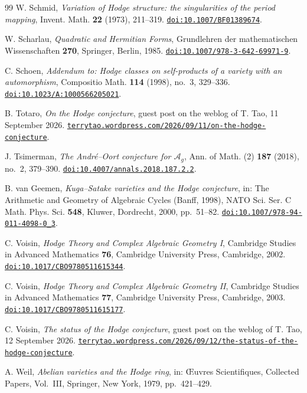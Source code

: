 \begin{thebibliography}{99}
W. Schmid,
\emph{Variation of Hodge structure: the singularities of the period mapping},
Invent. Math. \textbf{22} (1973), 211--319.
\href{https://doi.org/10.1007/BF01389674}{\texttt{doi:10.1007/BF01389674}}.

W. Scharlau,
\emph{Quadratic and Hermitian Forms},
Grundlehren der mathematischen Wissenschaften \textbf{270},
Springer, Berlin, 1985.
\href{https://doi.org/10.1007/978-3-642-69971-9}{\texttt{doi:10.1007/978-3-642-69971-9}}.

C. Schoen,
\emph{Addendum to: Hodge classes on self-products of a variety with an
automorphism},
Compositio Math. \textbf{114} (1998), no.~3, 329--336.
\href{https://doi.org/10.1023/A:1000566205021}{\texttt{doi:10.1023/A:1000566205021}}.

B. Totaro,
\emph{On the Hodge conjecture},
guest post on the weblog of T. Tao, 11 September 2026.
\href{https://terrytao.wordpress.com/2026/09/11/on-the-hodge-conjecture/}%
{\texttt{terrytao.wordpress.com/2026/09/11/on-the-hodge-conjecture}}.

J. Tsimerman,
\emph{The Andr\'e--Oort conjecture for $\mathcal{A}_{g}$},
Ann. of Math. (2) \textbf{187} (2018), no.~2, 379--390.
\href{https://doi.org/10.4007/annals.2018.187.2.2}{\texttt{doi:10.4007/annals.2018.187.2.2}}.

B. van Geemen,
\emph{Kuga--Satake varieties and the Hodge conjecture},
in: The Arithmetic and Geometry of Algebraic Cycles (Banff, 1998),
NATO Sci. Ser. C Math. Phys. Sci. \textbf{548},
Kluwer, Dordrecht, 2000, pp.~51--82.
\href{https://doi.org/10.1007/978-94-011-4098-0_3}{\texttt{doi:10.1007/978-94-011-4098-0\_3}}.

C. Voisin,
\emph{Hodge Theory and Complex Algebraic Geometry I},
Cambridge Studies in Advanced Mathematics \textbf{76},
Cambridge University Press, Cambridge, 2002.
\href{https://doi.org/10.1017/CBO9780511615344}{\texttt{doi:10.1017/CBO9780511615344}}.

C. Voisin,
\emph{Hodge Theory and Complex Algebraic Geometry II},
Cambridge Studies in Advanced Mathematics \textbf{77},
Cambridge University Press, Cambridge, 2003.
\href{https://doi.org/10.1017/CBO9780511615177}{\texttt{doi:10.1017/CBO9780511615177}}.

C. Voisin,
\emph{The status of the Hodge conjecture},
guest post on the weblog of T. Tao, 12 September 2026.
\href{https://terrytao.wordpress.com/2026/09/12/the-status-of-the-hodge-conjecture/}%
{\texttt{terrytao.wordpress.com/2026/09/12/the-status-of-the-hodge-conjecture}}.

A. Weil,
\emph{Abelian varieties and the Hodge ring},
in: \OE uvres Scientifiques, Collected Papers, Vol.~III,
Springer, New York, 1979, pp.~421--429.

\end{thebibliography}
